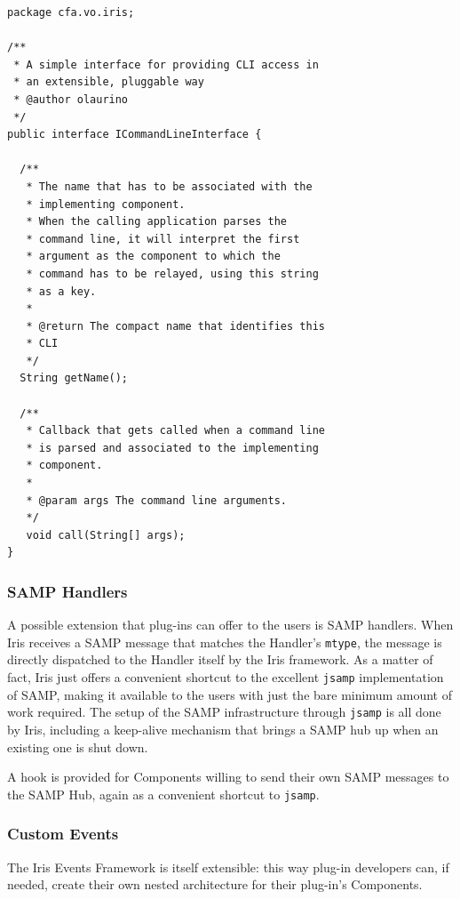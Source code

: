 \documentclass[preprint,authoryear,5p]{elsarticle}
\begin{document}
\begin{lstlisting}[style=java,
	caption={Every Iris component can expose a command line interface. Iris dispatches the command line arguments for the relative component to process. This code is written in Java.},
	label=lst:cli]
package cfa.vo.iris;

/**
 * A simple interface for providing CLI access in 
 * an extensible, pluggable way
 * @author olaurino
 */
public interface ICommandLineInterface {

  /**
   * The name that has to be associated with the
   * implementing component.
   * When the calling application parses the 
   * command line, it will interpret the first
   * argument as the component to which the 
   * command has to be relayed, using this string
   * as a key.
   *
   * @return The compact name that identifies this
   * CLI
   */
  String getName();

  /**
   * Callback that gets called when a command line 
   * is parsed and associated to the implementing 
   * component.
   *
   * @param args The command line arguments.
   */
   void call(String[] args);
}
\end{lstlisting}

\subsubsection{SAMP Handlers} A possible extension that plug-ins can offer to
the users is SAMP handlers. When Iris receives a SAMP message that matches the
Handler's \verb|mtype|, the message is directly dispatched to the Handler itself
by the Iris framework. As a matter of fact, Iris just offers a convenient
shortcut to the excellent \verb|jsamp| implementation of SAMP, making it
available to the users with just the bare minimum amount of work required. The
setup of the SAMP infrastructure through \verb|jsamp| is all done by Iris,
including a keep-alive mechanism that brings a SAMP hub up when an existing one is
shut down.

A hook is provided for Components willing to send their own SAMP messages to the
SAMP Hub, again as a convenient shortcut to \verb|jsamp|.

\subsubsection{Custom Events} The Iris Events Framework is itself extensible:
this way plug-in developers can, if needed, create their own nested
architecture for their plug-in's Components.
\end{document}
